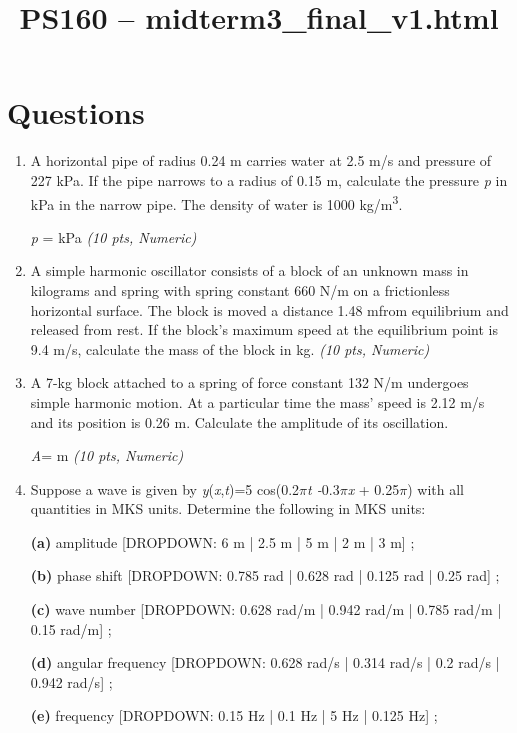 \documentclass[11pt]{article}
\title{PS160 -- midterm3\_final\_v1.html}
\date{}
\begin{document}
\maketitle

\section*{Questions}

\begin{enumerate}[leftmargin=*]
  \item A horizontal pipe of radius 0.24 m carries water at 2.5 m/s and pressure of 227 kPa. If the pipe narrows to a radius of 0.15 m, calculate the pressure \emph{p} in kPa in the narrow pipe. The density of water is 1000 kg/m\textsuperscript{3}.

\emph{p} = kPa \hfill \textit{(10 pts, Numeric)}

  \item A simple harmonic oscillator consists of a block of an unknown mass in kilograms and spring with spring constant 660 N/m on a frictionless horizontal surface. The block is moved a distance 1.48 m\textbf{}from equilibrium and released from rest. If the block's maximum speed at the equilibrium point is 9.4 m/s, calculate the mass of the block in kg. \hfill \textit{(10 pts, Numeric)}

  \item A 7-kg block attached to a spring of force constant 132 N/m undergoes simple harmonic motion. At a particular time the mass' speed is 2.12 m/s and its position is 0.26 m. Calculate the amplitude of its oscillation.

\emph{A}= m \hfill \textit{(10 pts, Numeric)}

  \item Suppose a wave is given by \emph{y}(\emph{x},\emph{t})=5 cos(0.2$\pi$\emph{t -}0.3$\pi$\emph{x} + 0.25$\pi$) with all quantities in MKS units. Determine the following in MKS units:

\textbf{(a)} amplitude [DROPDOWN: 6 m | 2.5 m | 5 m | 2 m | 3 m]
;

\textbf{(b)} phase shift [DROPDOWN: 0.785 rad | 0.628 rad | 0.125 rad | 0.25 rad]
;

\textbf{(c)} wave number [DROPDOWN: 0.628 rad/m | 0.942 rad/m | 0.785 rad/m | 0.15 rad/m]
;

\textbf{(d)} angular frequency [DROPDOWN: 0.628 rad/s | 0.314 rad/s | 0.2 rad/s | 0.942 rad/s]
;

\textbf{(e)} frequency [DROPDOWN: 0.15 Hz | 0.1 Hz | 5 Hz | 0.125 Hz]
;


\end{enumerate}
\end{document}
